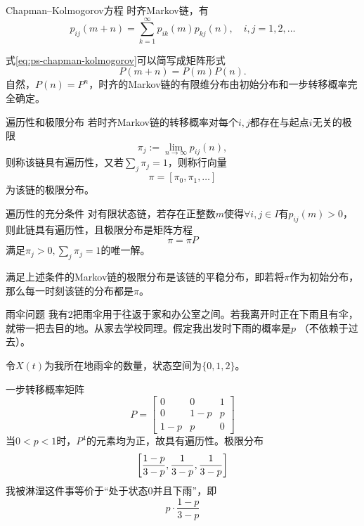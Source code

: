 \begin{theorem}{Chapman--Kolmogorov方程}{}
	时齐Markov链，有
	\begin{equation}\label{eq:ps-chapman-kolmogorov}
		p_{ij}(m + n) = \sum_{k=1}^\infty p_{ik}(m)p_{kj}(n),\quad i,j = 1,2,\ldots
	\end{equation}
\end{theorem}
式\eqref{eq:ps-chapman-kolmogorov}可以简写成矩阵形式
\begin{equation}\label{eq:ps-markov-semigroup}
	P(m + n) = P(m)P(n).
\end{equation}
自然，$P(n) = P^n$，时齐的Markov链的有限维分布由初始分布和一步转移概率完全确定。
\begin{definition}{遍历性和极限分布}{}
	若时齐Markov链的转移概率对每个$i,j$都存在与起点$i$无关的极限
	\begin{equation}\label{eq:ps-limiting-probability}
		\pi_j := \lim_{n\to\infty}p_{ij}(n),
	\end{equation}
	则称该链具有遍历性，又若$\textstyle\sum_{j}\pi_j = 1$，则称行向量
	\[
		\pi = [\pi_0,\pi_1,\ldots]
	\]
	为该链的极限分布。
\end{definition}
\begin{theorem}{遍历性的充分条件}{}
	对有限状态链，若存在正整数$m$使得$\forall i,j \in I$有$p_{ij}(m) > 0$，则此链具有遍历性，且极限分布是矩阵方程
	\begin{equation}
		\pi = \pi P
	\end{equation}
	满足$\pi_j > 0,\textstyle\sum_j\pi_j = 1$的唯一解。
\end{theorem}
满足上述条件的Markov链的极限分布是该链的平稳分布，即若将$\pi$作为初始分布，那么每一时刻该链的分布都是$\pi$。
\begin{example}{雨伞问题}{}
	我有2把雨伞用于往返于家和办公室之间。若我离开时正在下雨且有伞，就带一把去目的地。从家去学校同理。假定我出发时下雨的概率是$ p$ （不依赖于过去）。

	令$ X(t) $为我所在地雨伞的数量，状态空间为$\{0, 1, 2\}$。
	
	一步转移概率矩阵
	\[
		P = \begin{bmatrix}
			0&0&1\\
			0&1 - p&p\\
			1 - p&p&0
		\end{bmatrix}
	\]
	当$0 < p < 1$时，$P^4$的元素均为正，故具有遍历性。极限分布
	\[
		\biggl[\frac{1 - p}{3 - p},\frac1{3 - p},\frac1{3 - p}\biggr]
	\]
	我被淋湿这件事等价于“处于状态0并且下雨”，即
	\[
		p \cdot \frac{1 - p}{3 - p}
	\]
\end{example}
